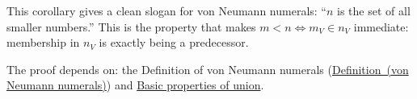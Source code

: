 \begin{remark*}[Significance]
This corollary gives a clean slogan for von Neumann numerals: ``$n$ is the set
of all smaller numbers.'' This is the property that makes $m < n \Leftrightarrow
m_V \in n_V$ immediate: membership in $n_V$ is exactly being a predecessor.
\end{remark*}

\begin{remark*}[Dependencies]
The proof depends on: the Definition of von Neumann numerals
(\hyperref[def:vn-numerals]{Definition~(von Neumann numerals)}) and
\hyperref[prop:union-basics]{Basic properties of union}.
\end{remark*}
